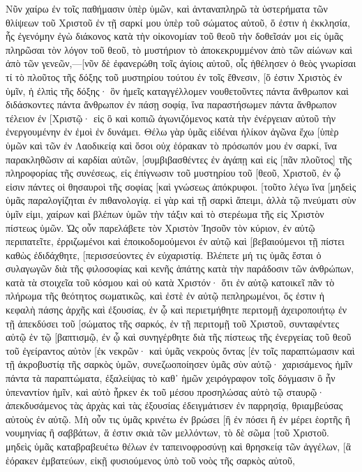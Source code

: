Νῦν χαίρω ἐν τοῖς παθήμασιν ὑπὲρ ὑμῶν, καὶ ἀνταναπληρῶ τὰ ὑστερήματα τῶν θλίψεων τοῦ Χριστοῦ ἐν τῇ σαρκί μου ὑπὲρ τοῦ σώματος αὐτοῦ, ὅ ἐστιν ἡ ἐκκλησία, 
ἧς ἐγενόμην ἐγὼ διάκονος κατὰ τὴν οἰκονομίαν τοῦ θεοῦ τὴν δοθεῖσάν μοι εἰς ὑμᾶς πληρῶσαι τὸν λόγον τοῦ θεοῦ, 
τὸ μυστήριον τὸ ἀποκεκρυμμένον ἀπὸ τῶν αἰώνων καὶ ἀπὸ τῶν γενεῶν,—[νῦν δὲ ἐφανερώθη τοῖς ἁγίοις αὐτοῦ, 
οἷς ἠθέλησεν ὁ θεὸς γνωρίσαι τί τὸ πλοῦτος τῆς δόξης τοῦ μυστηρίου τούτου ἐν τοῖς ἔθνεσιν, [ὅ ἐστιν Χριστὸς ἐν ὑμῖν, ἡ ἐλπὶς τῆς δόξης· 
ὃν ἡμεῖς καταγγέλλομεν νουθετοῦντες πάντα ἄνθρωπον καὶ διδάσκοντες πάντα ἄνθρωπον ἐν πάσῃ σοφίᾳ, ἵνα παραστήσωμεν πάντα ἄνθρωπον τέλειον ἐν [Χριστῷ· 
εἰς ὃ καὶ κοπιῶ ἀγωνιζόμενος κατὰ τὴν ἐνέργειαν αὐτοῦ τὴν ἐνεργουμένην ἐν ἐμοὶ ἐν δυνάμει. 
Θέλω γὰρ ὑμᾶς εἰδέναι ἡλίκον ἀγῶνα ἔχω [ὑπὲρ ὑμῶν καὶ τῶν ἐν Λαοδικείᾳ καὶ ὅσοι οὐχ ἑόρακαν τὸ πρόσωπόν μου ἐν σαρκί, 
ἵνα παρακληθῶσιν αἱ καρδίαι αὐτῶν, [συμβιβασθέντες ἐν ἀγάπῃ καὶ εἰς [πᾶν πλοῦτος] τῆς πληροφορίας τῆς συνέσεως, εἰς ἐπίγνωσιν τοῦ μυστηρίου τοῦ [θεοῦ, Χριστοῦ, 
ἐν ᾧ εἰσιν πάντες οἱ θησαυροὶ τῆς σοφίας [καὶ γνώσεως ἀπόκρυφοι. 
[τοῦτο λέγω ἵνα [μηδεὶς ὑμᾶς παραλογίζηται ἐν πιθανολογίᾳ. 
εἰ γὰρ καὶ τῇ σαρκὶ ἄπειμι, ἀλλὰ τῷ πνεύματι σὺν ὑμῖν εἰμι, χαίρων καὶ βλέπων ὑμῶν τὴν τάξιν καὶ τὸ στερέωμα τῆς εἰς Χριστὸν πίστεως ὑμῶν. 
Ὡς οὖν παρελάβετε τὸν Χριστὸν Ἰησοῦν τὸν κύριον, ἐν αὐτῷ περιπατεῖτε, 
ἐρριζωμένοι καὶ ἐποικοδομούμενοι ἐν αὐτῷ καὶ [βεβαιούμενοι τῇ πίστει καθὼς ἐδιδάχθητε, [περισσεύοντες ἐν εὐχαριστίᾳ. 
Βλέπετε μή τις ὑμᾶς ἔσται ὁ συλαγωγῶν διὰ τῆς φιλοσοφίας καὶ κενῆς ἀπάτης κατὰ τὴν παράδοσιν τῶν ἀνθρώπων, κατὰ τὰ στοιχεῖα τοῦ κόσμου καὶ οὐ κατὰ Χριστόν· 
ὅτι ἐν αὐτῷ κατοικεῖ πᾶν τὸ πλήρωμα τῆς θεότητος σωματικῶς, 
καὶ ἐστὲ ἐν αὐτῷ πεπληρωμένοι, ὅς ἐστιν ἡ κεφαλὴ πάσης ἀρχῆς καὶ ἐξουσίας, 
ἐν ᾧ καὶ περιετμήθητε περιτομῇ ἀχειροποιήτῳ ἐν τῇ ἀπεκδύσει τοῦ [σώματος τῆς σαρκός, ἐν τῇ περιτομῇ τοῦ Χριστοῦ, 
συνταφέντες αὐτῷ ἐν τῷ [βαπτισμῷ, ἐν ᾧ καὶ συνηγέρθητε διὰ τῆς πίστεως τῆς ἐνεργείας τοῦ θεοῦ τοῦ ἐγείραντος αὐτὸν [ἐκ νεκρῶν· 
καὶ ὑμᾶς νεκροὺς ὄντας [ἐν τοῖς παραπτώμασιν καὶ τῇ ἀκροβυστίᾳ τῆς σαρκὸς ὑμῶν, συνεζωοποίησεν ὑμᾶς σὺν αὐτῷ· χαρισάμενος ἡμῖν πάντα τὰ παραπτώματα, 
ἐξαλείψας τὸ καθ᾽ ἡμῶν χειρόγραφον τοῖς δόγμασιν ὃ ἦν ὑπεναντίον ἡμῖν, καὶ αὐτὸ ἦρκεν ἐκ τοῦ μέσου προσηλώσας αὐτὸ τῷ σταυρῷ· 
ἀπεκδυσάμενος τὰς ἀρχὰς καὶ τὰς ἐξουσίας ἐδειγμάτισεν ἐν παρρησίᾳ, θριαμβεύσας αὐτοὺς ἐν αὐτῷ. 
Μὴ οὖν τις ὑμᾶς κρινέτω ἐν βρώσει [ἢ ἐν πόσει ἢ ἐν μέρει ἑορτῆς ἢ νουμηνίας ἢ σαββάτων, 
ἅ ἐστιν σκιὰ τῶν μελλόντων, τὸ δὲ σῶμα [τοῦ Χριστοῦ. 
μηδεὶς ὑμᾶς καταβραβευέτω θέλων ἐν ταπεινοφροσύνῃ καὶ θρησκείᾳ τῶν ἀγγέλων, [ἃ ἑόρακεν ἐμβατεύων, εἰκῇ φυσιούμενος ὑπὸ τοῦ νοὸς τῆς σαρκὸς αὐτοῦ, 
